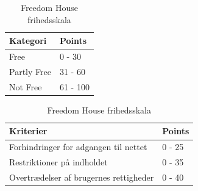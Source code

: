 \begin{table}[H]
    \begin{minipage}{.5\textwidth}
        \centering
        \begin{tabular}{|l|l|}
            \hline
            \textbf{Kategori} & \textbf{Points} \\ \hline
            Free              & 0 - 30          \\ \hline
            Partly Free       & 31 - 60         \\ \hline
            Not Free          & 61 - 100        \\ \hline
        \end{tabular}
        \caption{Freedom House frihedsskala}
        \label{fig:freedomscale}
    \end{minipage}
    \begin{minipage}{.5\textwidth}
        \centering
        \begin{tabular}{|l|l|}
            \hline
            \textbf{Kriterier}                     & \textbf{Points} \\ \hline
            Forhindringer for adgangen til nettet  & 0 - 25          \\ \hline
            Restriktioner på indholdet             & 0 - 35          \\ \hline
            Overtrædelser af brugernes rettigheder & 0 - 40          \\ \hline
        \end{tabular}
        \caption{Freedom House frihedsskala}
        \label{fig:freedomscale2}
    \end{minipage}
\end{table}

